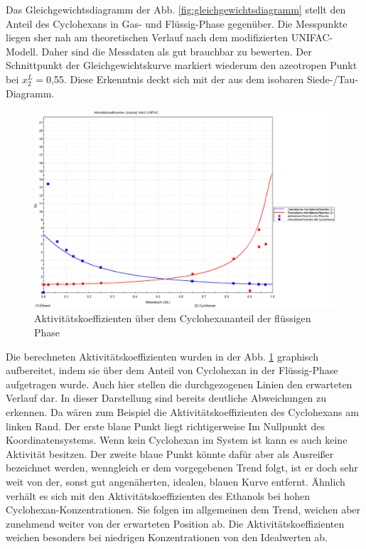 Das Gleichgewichtsdiagramm der Abb. \ref{fig:gleichgewichtsdiagramm} stellt den Anteil des Cyclohexans in Gas- und Flüssig-Phase gegenüber. Die Messpunkte liegen sher nah am theoretischen Verlauf nach dem modifizierten UNIFAC-Modell. Daher sind die Messdaten als gut brauchbar zu bewerten. Der Schnittpunkt der Gleichgewichtskurve markiert wiederum den azeotropen Punkt bei $x_2^L=$0,55. Diese Erkenntnis deckt sich mit der aus dem isobaren Siede-/Tau-Diagramm.\\

\begin{figure}[h!]
	\centering
	\includegraphics[width=1.1\linewidth]{img/Aktiv}
	\caption{Aktivitätskoeffizienten über dem Cyclohexananteil der flüssigen Phase}
	\label{fig:Aktiv}
\end{figure}

Die berechneten Aktivitätskoeffizienten wurden in der Abb. \ref{fig:Aktiv} graphisch aufbereitet, indem sie über dem Anteil von Cyclohexan in der Flüssig-Phase aufgetragen wurde. Auch hier stellen die durchgezogenen Linien den erwarteten Verlauf dar. In dieser Darstellung sind bereits deutliche Abweichungen zu erkennen. Da wären zum Beispiel die Aktivitätskoeffizienten des Cyclohexans am linken Rand. Der erste blaue Punkt liegt richtigerweise Im Nullpunkt des Koordinatensystems. Wenn kein Cyclohexan im System ist kann es auch keine Aktivität besitzen. Der zweite blaue Punkt könnte dafür aber als Ausreißer bezeichnet werden, wenngleich er dem vorgegebenen Trend folgt, ist er doch sehr weit von der, sonst gut angenäherten, idealen, blauen Kurve entfernt. Ähnlich verhält es sich mit den Aktivitätskoeffizienten des Ethanols bei hohen Cyclohexan-Konzentrationen. Sie folgen im allgemeinen dem Trend, weichen aber zunehmend weiter von der erwarteten Position ab. Die Aktivitätskoeffizienten weichen besonders bei niedrigen Konzentrationen von den Idealwerten ab.



